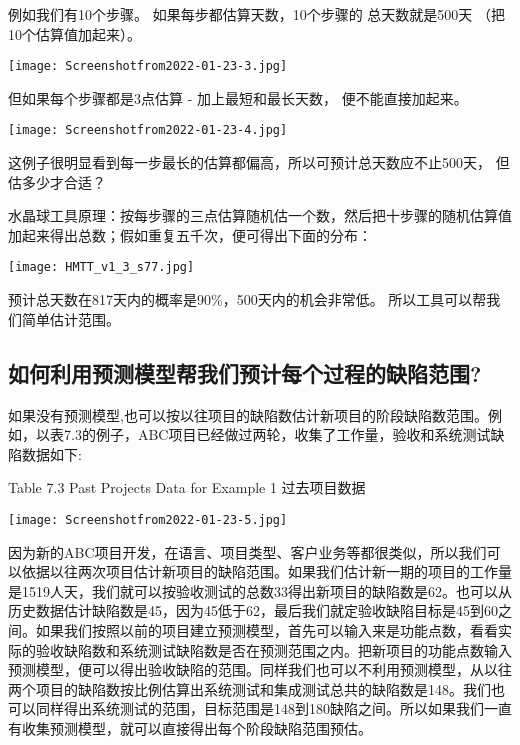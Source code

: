 例如我们有10个步骤。 如果每步都估算天数，10个步骤的 总天数就是500天
（把10个估算值加起来）。

\texttt{[image: Screenshotfrom2022-01-23-3.jpg]}


但如果每个步骤都是3点估算 - 加上最短和最长天数， 便不能直接加起来。

\texttt{[image: Screenshotfrom2022-01-23-4.jpg]}

这例子很明显看到每一步最长的估算都偏高，所以可预计总天数应不止500天，
但估多少才合适？

水晶球工具原理：按每步骤的三点估算随机估一个数，然后把十步骤的随机估算值加起来得出总数；假如重复五千次，便可得出下面的分布：


\texttt{[image: HMTT\_v1\_3\_s77.jpg]}

预计总天数在817天内的概率是90\%，500天内的机会非常低。
所以工具可以帮我们简单估计范围。

\hypertarget{ux5982ux4f55ux5229ux7528ux9884ux6d4bux6a21ux578bux5e2eux6211ux4eecux9884ux8ba1ux6bcfux4e2aux8fc7ux7a0bux7684ux7f3aux9677ux8303ux56f4}{%
\subsection{如何利用预测模型帮我们预计每个过程的缺陷范围?}\label{ux5982ux4f55ux5229ux7528ux9884ux6d4bux6a21ux578bux5e2eux6211ux4eecux9884ux8ba1ux6bcfux4e2aux8fc7ux7a0bux7684ux7f3aux9677ux8303ux56f4}}

如果没有预测模型,也可以按以往项目的缺陷数估计新项目的阶段缺陷数范围。例如，以表7.3的例子，ABC项目已经做过两轮，收集了工作量，验收和系统测试缺陷数据如下:

Table 7.3 Past Projects Data for Example 1 过去项目数据

\texttt{[image: Screenshotfrom2022-01-23-5.jpg]}

因为新的ABC项目开发，在语言、项目类型、客户业务等都很类似，所以我们可以依据以往两次项目估计新项目的缺陷范围。如果我们估计新一期的项目的工作量是1519人天，我们就可以按验收测试的总数33得出新项目的缺陷数是62。也可以从历史数据估计缺陷数是45，因为45低于62，最后我们就定验收缺陷目标是45到60之间。如果我们按照以前的项目建立预测模型，首先可以输入来是功能点数，看看实际的验收缺陷数和系统测试缺陷数是否在预测范围之内。把新项目的功能点数输入预测模型，便可以得出验收缺陷的范围。同样我们也可以不利用预测模型，从以往两个项目的缺陷数按比例估算出系统测试和集成测试总共的缺陷数是148。我们也可以同样得出系统测试的范围，目标范围是148到180缺陷之间。所以如果我们一直有收集预测模型，就可以直接得出每个阶段缺陷范围预估。

